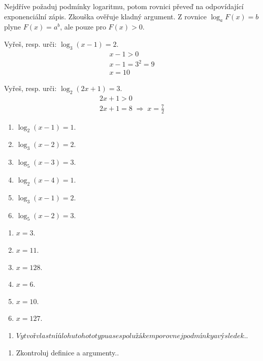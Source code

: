 \documentclass[11pt,a4paper]{article}
\begin{document}
Nejdříve požaduj podmínky logaritmu, potom rovnici převeď na odpovídající exponenciální zápis. Zkouška ověřuje kladný argument.
Z rovnice $\log_a F(x)=b$ plyne $F(x)=a^b$, ale pouze pro $F(x)>0$.
\begin{prikladReseniBox}[title={Příklad 1}]
Vyřeš, resp. urči: $\log_3(x-1)=2$.
\tcblower
\[\begin{aligned}x-1>0 \\ x-1=3^2=9 \\ x=10\end{aligned}\]
\end{prikladReseniBox}
\begin{prikladReseniBox}[title={Příklad 2}]
Vyřeš, resp. urči: $\log_2(2x+1)=3$.
\tcblower
\[\begin{aligned}2x+1>0 \\ 2x+1=8\;\Longrightarrow\;x=\frac{7}{2}\end{aligned}\]
\end{prikladReseniBox}
\begin{zadaniReseniBox}[title={Samostatná práce 1}]
\begin{enumerate}[label=\alph*)]
\item $\log_{2}(x-1)=1$.
\item $\log_{3}(x-2)=2$.
\item $\log_{5}(x-3)=3$.
\item $\log_{2}(x-4)=1$.
\item $\log_{3}(x-1)=2$.
\item $\log_{5}(x-2)=3$.
\end{enumerate}
\tcblower
\begin{enumerate}[label=\alph*)]
\item $x=3$.
\item $x=11$.
\item $x=128$.
\item $x=6$.
\item $x=10$.
\item $x=127$.
\end{enumerate}
\end{zadaniReseniBox}
\begin{zadaniReseniBox}[title={Rozšíření 1}]
\begin{enumerate}[label=\alph*)]
\item $Vytvoř vlastní úlohu tohoto typu a se spolužákem porovnej podmínky a výsledek.$.
\end{enumerate}
\tcblower
\begin{enumerate}[label=\alph*)]
\item Zkontroluj definice a argumenty..
\end{enumerate}
\end{zadaniReseniBox}
\end{document}
